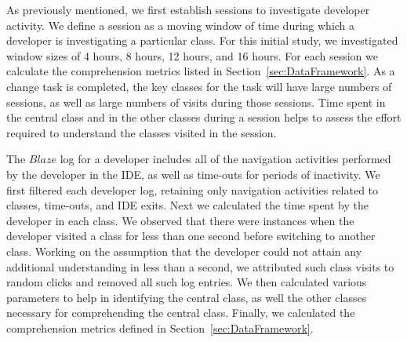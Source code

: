 As previously mentioned, we first establish sessions to investigate developer activity. We define a session as a moving window of time during which a developer is investigating a particular class. For this initial study, we investigated window sizes of 4 hours, 8 hours, 12 hours, and 16 hours.
For each session we calculate the comprehension metrics listed in Section~\ref{sec:DataFramework}. As a change task is completed, the key classes for the task will have large numbers of sessions, as well as large numbers of visits during those sessions. Time spent in the central class and in the other classes during a session helps to assess the effort required to understand the classes visited in the session.

The $Blaze$ log for a developer includes all of the navigation activities performed by the developer in the IDE, as well as time-outs for periods of inactivity. We first filtered each developer log, retaining only navigation activities related to classes, time-outs, and IDE exits. Next we calculated the time spent by the developer in each class. We observed that there were instances when the developer visited a class for less than one second before switching to another class. Working on the assumption that the developer could not attain any additional understanding in less than a second,  we attributed such class visits to random clicks and removed all such log entries. We then calculated various parameters to help in identifying the central class, as well the other classes necessary for comprehending the central class.   Finally, we calculated the comprehension metrics defined in Section~\ref{sec:DataFramework}.

